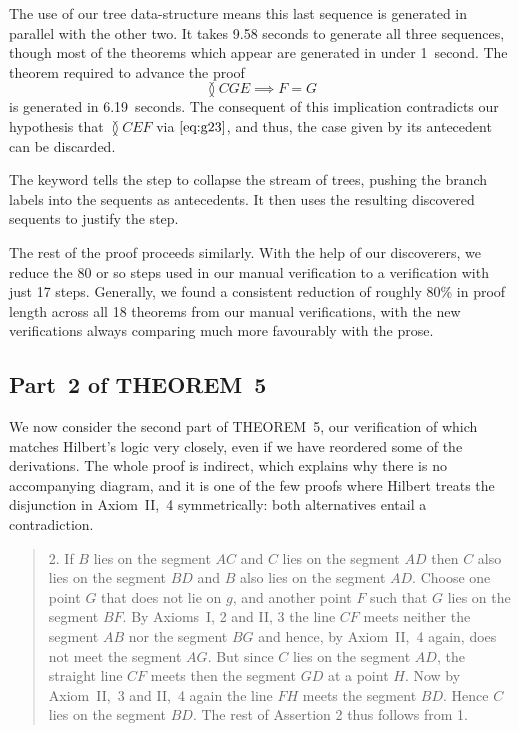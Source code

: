 The use of our tree data-structure means this last sequence is generated in parallel with the other two. It takes 9.58 seconds to generate all three sequences, though most of the theorems which appear are generated in under 1~second. The theorem required to advance the proof
\begin{displaymath}
\between{C}{G}{E} \implies F = G
\end{displaymath}
is generated in 6.19~seconds. The consequent of this implication contradicts our hypothesis that $\between{C}{E}{F}$ via $\eqref{eq:g23}$, and thus, the case given by its antecedent can be discarded.

\linebreak

The  keyword tells the step to collapse the stream of trees, pushing the branch labels into the sequents as antecedents. It then uses the resulting discovered sequents to justify the step.

The rest of the proof proceeds similarly. With the help of our discoverers, we reduce the 80 or so steps used in our manual verification to a verification with just 17 steps. Generally, we found a consistent reduction of roughly 80\% in proof length across all 18 theorems from our manual verifications, with the new verifications always comparing much more favourably with the prose.

\subsection{Part~2 of THEOREM~5}
We now consider the second part of THEOREM~5, our verification of which matches Hilbert's logic very closely, even if we have reordered some of the derivations. The whole proof is indirect, which explains why there is no accompanying diagram, and it is one of the few proofs where Hilbert treats the disjunction in Axiom~II,~4 symmetrically: both alternatives entail a contradiction.

\begin{quotation}2. If $B$ lies on the segment $AC$ and $C$ lies on the segment $AD$ then $C$ also lies on the segment $BD$ and $B$ also lies on the segment $AD$. Choose one point $G$ that does not lie on $g$, and another point $F$ such that $G$ lies on the segment $BF$. By Axioms~I, 2 and II, 3 the line $CF$ meets neither the segment $AB$ nor the segment $BG$ and hence, by Axiom~II,~4 again, does not meet the segment $AG$. But since $C$ lies on the segment $AD$, the straight line $CF$ meets then the segment $GD$ at a point $H$. Now by Axiom~II,~3 and II,~4 again the line $FH$ meets the segment $BD$. Hence $C$ lies on the segment $BD$. The rest of Assertion 2 thus follows from 1.
\end{quotation}

